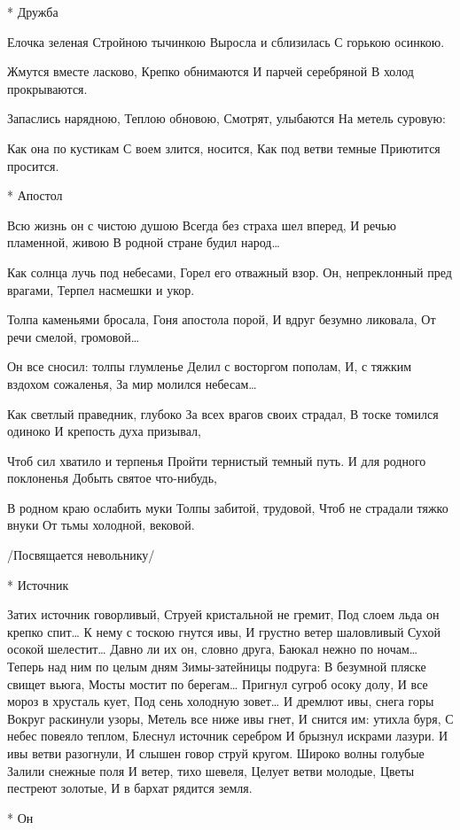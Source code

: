 * Дружба

Елочка зеленая
Стройною тычинкою
Выросла и сблизилась
С горькою осинкою.

Жмутся вместе ласково,
Крепко обнимаются
И парчей серебряной
В холод прокрываются.

Запаслись нарядною,
Теплою обновою,
Смотрят, улыбаются
На метель суровую:

Как она по кустикам
С воем злится, носится,
Как под ветви темные
Приютится просится.


* Апостол

Всю жизнь он с чистою душою
Всегда без страха шел вперед,
И речью пламенной, живою
В родной стране будил народ…

Как солнца лучь под небесами,
Горел его отважный взор.
Он, непреклонный пред врагами,
Терпел насмешки и укор.

Толпа каменьями бросала,
Гоня апостола порой,
И вдруг безумно ликовала,
От речи смелой, громовой…

Он все сносил: толпы глумленье
Делил с восторгом пополам,
И, с тяжким вздохом сожаленья,
За мир молился небесам…

Как светлый праведник, глубоко
За всех врагов своих страдал,
В тоске томился одиноко
И крепость духа призывал,

Чтоб сил хватило и терпенья
Пройти тернистый темный путь.
И для родного поклоненья
Добыть святое что-нибудь,

В родном краю ослабить муки
Толпы забитой, трудовой,
Чтоб не страдали тяжко внуки
От тьмы холодной, вековой.

/Посвящается невольнику/


* Источник

Затих источник говорливый,
Струей кристальной не гремит,
Под слоем льда он крепко спит…
К нему с тоскою гнутся ивы,
И грустно ветер шаловливый
Сухой осокой шелестит…
Давно ли их он, словно друга,
Баюкал нежно по ночам…
Теперь над ним по целым дням
Зимы-затейницы подруга:
В безумной пляске свищет вьюга,
Мосты мостит по берегам…
Пригнул сугроб осоку долу,
И все мороз в хрусталь кует,
Под сень холодную зовет…
И дремлют ивы, снега горы
Вокруг раскинули узоры,
Метель все ниже ивы гнет,
И снится им: утихла буря,
С небес повеяло теплом,
Блеснул источник серебром
И брызнул искрами лазури.
И ивы ветви разогнули,
И слышен говор струй кругом.
Широко волны голубые
Залили снежные поля
И ветер, тихо шевеля,
Целует ветви молодые,
Цветы пестреют золотые,
И в бархат рядится земля.


* Он

